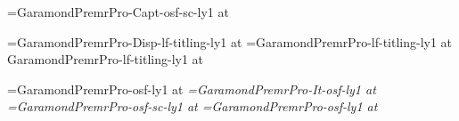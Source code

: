 \def\romantext{GaramondPremrPro-osf-ly1 }
\def\italictext{GaramondPremrPro-It-osf-ly1 }
\def\smallcaptext{GaramondPremrPro-osf-sc-ly1 }
\def\romantitlingtext{GaramondPremrPro-lf-titling-ly1 }
\def\smallcapcaption{GaramondPremrPro-Capt-osf-sc-ly1 }
\def\romantitlingdisplay{GaramondPremrPro-Disp-lf-titling-ly1 }

\font\pageframefont=\smallcapcaption at \pageframesize


\font\chaptertitlefont=\romantitlingdisplay at \aheadsize
\font\scenetitlefont=\romantitlingtext at \bheadsize
\font\authorinfotitlefont \romantitlingtext at \smalltextsize
\def\bookinfotitlefont{\scenetitlefont}

\font\rm=\romantext at \textsize
\font\it=\italictext at \textsize
\font\sc=\smallcaptext at \textsize
\font\fineprint=\romantext at \smalltextsize

%
%

\def\useemptypageframe{
  \global\headline={\line{}}
  \global\footline={\line{}}
  \global\@cleared@pagefalse
  \global\@display@pagefalse
}

\def\usedisplaypageframe{\@display@pagetrue\@cleared@pagefalse}

\def\usenormalpageframe{
  \global\headline={\pageframefont\normalpageheadline}
  \global\footline={\pageframefont\normalpagefootline}
  \global\@cleared@pagefalse
  \global\@display@pagefalse
}

\def\displaypagefootline{\pageframefont\hfil\folio\hfil}
\def\normalpageheadline{\ifodd\pageno\normaloddpageheadline\else\normalevenpageheadline\fi}
\def\normalpagefootline{\line{}}
\def\normaloddpageheadline{\title\hfil\folio}
\def\normalevenpageheadline{\folio\hfil\author}


%
%

\def\nextpage{\vfil\eject\global\@cleared@pagetrue\global\@display@pagefalse\relax}
\def\nextoddpage{\nextpage\ifodd\pageno \else \line{}\nextpage\fi}
\def\nextevenpage{\nextpage\ifodd\pageno \line{}\nextpage\else \fi}

\def\titlepage#1#2#3{
  \nextoddpage
  \useemptypageframe
  \baselinebox{\typesetbooktitle{#1}}{10}{0}
  \baselinebox{\typesetauthorname{#2}}{6}{6}
  \rightline{#3}
  \eject
}

